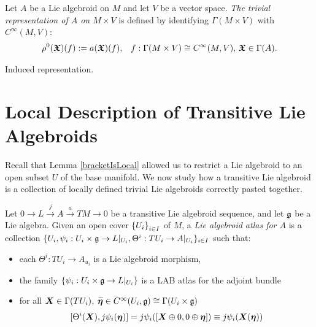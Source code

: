\begin{definition}
Let $A$ be a Lie algebroid on $M$ and let $V$ be a vector space. \emph{The trivial representation of $A$ on $M \times V$} is defined by identifying $\Gamma(M \times V)$ with $C^\infty(M, V)$:
\begin{align*}
    \rho^0(\bm{\mathfrak{X}})(f) := a(\bm{\mathfrak{X}})(f), && f: \Gamma(M \times V) \cong C^\infty(M, V),\, \bm{\mathfrak{X}} \in \Gamma(A).
\end{align*}
\end{definition}

\begin{definition}
Induced representation.
\end{definition}

\section{Local Description of Transitive Lie Algebroids}

Recall that Lemma \ref{bracketIsLocal} allowed us to restrict a Lie algebroid to an open subset $U$ of the base manifold. We now study how a transitive Lie algebroid is a collection of locally defined trivial Lie algebroids correctly pasted together.

\begin{definition}
Let $0 \to L \xrightarrow{j} A \xrightarrow{a} TM \to 0$ be a transitive Lie algebroid sequence, and let $\mathfrak{g}$ be a Lie algebra. Given an open cover $\left\{ U_i \right\}_{i \in I}$ of $M$, a \emph{Lie algebroid atlas for $A$} is a collection $\{U_i, \psi_i:U_i \times \mathfrak{g} \to L|_{U_i}, \Theta^i: TU_i \to A|_{U_i}\}_{i \in I}$ such that:
    \begin{itemize}
    
    \item each $\Theta^i: TU_i \to A_{u_i}$ is a Lie algebroid morphism,
    
    \item the family $\left\{ \psi_i:U_i \times \mathfrak{g} \to L|_{U_i} \right\}$ is a LAB atlas for the adjoint bundle 
    
    \item for all $\bm{X} \in \Gamma(TU_i)$, $\widetilde{\bm{\eta}} \in C^\infty(U_i, \mathfrak{g}) \cong \Gamma(U_i \times \mathfrak{g})$
        \begin{align} \label{eqnCompLocal}
            [\Theta^i(\bm{X}), j\psi_i(\bm{\eta})] = j\psi_i([\bm{X} \oplus 0, 0 \oplus \bm{\eta}]) \equiv j\psi_i(\bm{X}(\bm{\eta})) 
        \end{align}
    
    \end{itemize}
\end{definition}


